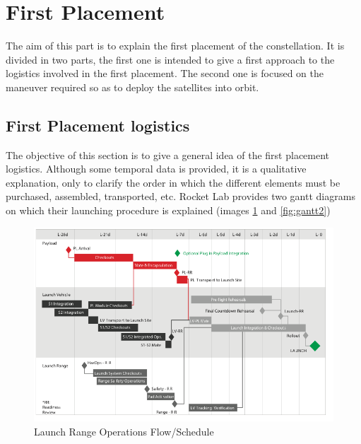 
\section{First Placement}
The aim of this part is to explain the first placement of the constellation. It is divided in two parts, the first one is intended to give a first approach to the logistics involved in the first placement. The second one is focused on the maneuver required so as to deploy the satellites into orbit. 
\subsection{First Placement logistics}
The objective of this section is to give a general idea of the first placement logistics. Although some temporal data is provided, it is a qualitative explanation, only to clarify the order in which the different elements must be purchased, assembled, transported, etc. %
Rocket Lab provides two gantt diagrams on which their launching procedure is explained (images \ref{fig:gantt1} and \ref{fig:gantt2}) 

\begin{figure}[h!]
\centering 
\includegraphics[scale=0.7]{./sections/Constellation_Deployment/S4-First_Placement/Images_S4/Picture_1_S4.png} 
\caption{Launch Range Operations Flow/Schedule}
\label{fig:gantt1}
\end{figure}

